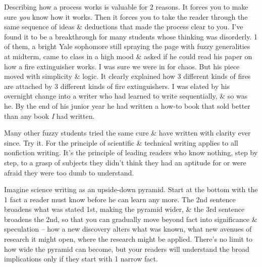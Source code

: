 \documentclass{article}
\begin{document}
Describing how a process works is valuable for 2 reasons. It forces you to make sure \textit{you} know how it works. Then it forces you to take the reader through the same sequence of ideas \& deductions that made the process clear to you. I've found it to be a breakthrough for many students whose thinking was disorderly. 1 of them, a bright Yale sophomore still spraying the page with fuzzy generalities at midterm, came to class in a high mood \& asked if he could read his paper on how a fire extinguisher works. I was sure we were in for chaos. But his piece moved with simplicity \& logic. It clearly explained how 3 different kinds of fires are attached by 3 different kinds of fire extinguishers. I was elated by his overnight change into a writer who had learned to write sequentially, \& so was he. By the end of his junior year he had written a how-to book that sold better than any book \textit{I} had written.

Many other fuzzy students tried the same cure \& have written with clarity ever since. Try it. For the principle of scientific \& technical writing applies to all nonfiction writing. It's the principle of leading readers who know nothing, step by step, to a grasp of subjects they didn't think they had an aptitude for or were afraid they were too dumb to understand.

Imagine science writing as an upside-down pyramid. Start at the bottom with the 1 fact a reader must know before he can learn any more. The 2nd sentence broadens what was stated 1st, making the pyramid wider, \& the 3rd sentence broadens the 2nd, so that you can gradually move beyond fact into significance \& speculation -- how a new discovery alters what was known, what new avenues of research it might open, where the research might be applied. There's no limit to how wide the pyramid can become, but your readers will understand the broad implications only if they start with 1 narrow fact.
\end{document}
